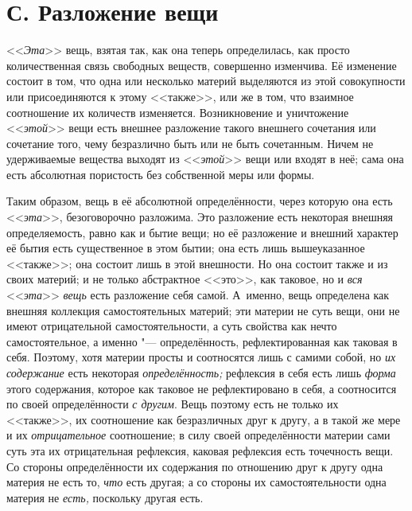 \section[С. Разложение вещи]{С. Разложение вещи}

<<{\em Эта}>> вещь, взятая
так, как она теперь определилась, как просто количественная связь свободных
веществ, совершенно изменчива. Её изменение состоит в том, что одна или
несколько материй выделяются из этой совокупности или присоединяются к
этому <<также>>, или же в том, что взаимное соотношение их количеств
изменяется. Возникновение и уничтожение <<{\em этой}>>
вещи есть внешнее разложение такого внешнего сочетания или сочетание того,
чему безразлично быть или не быть сочетанным. Ничем не удерживаемые
вещества выходят из <<{\em этой}>> вещи или входят в неё;
сама она есть абсолютная пористость без собственной меры или формы.

Таким образом, вещь в её абсолютной определённости, через которую она есть
<<{\em эта}>>, безоговорочно разложима. Это разложение
есть некоторая внешняя определяемость, равно как и бытие вещи; но её
разложение и внешний характер её бытия есть существенное в этом бытии; она
есть лишь вышеуказанное <<также>>; она состоит лишь в этой внешности. Но она
состоит также и из своих материй; и не только абстрактное <<это>>, как
таковое, но и {\em вся}
<<{\em эта}>> {\em вещь} есть
разложение себя самой. А~именно, вещь определена как внешняя коллекция
самостоятельных материй; эти материи не суть вещи, они не имеют
отрицательной самостоятельности, а суть свойства как нечто самостоятельное,
а именно "--- определённость, рефлектированная как таковая в себя. Поэтому,
хотя материи просты и соотносятся лишь с самими собой, но
{\em их содержание} есть некоторая
{\em определённость;} рефлексия в себя есть лишь
{\em форма} этого содержания, которое как таковое не
рефлектировано в себя, а соотносится по своей определённости
{\em с другим}. Вещь поэтому есть не только их <<также>>,
их соотношение как безразличных друг к другу, а в такой же мере и их
{\em отрицательное} соотношение; в силу своей
определённости материи сами суть эта их отрицательная рефлексия, каковая
рефлексия есть точечность вещи. Со стороны определённости их содержания по
отношению друг к другу одна материя не есть то,
{\em что} есть другая; а со стороны их
самостоятельности одна материя не {\em есть,} поскольку другая есть.

